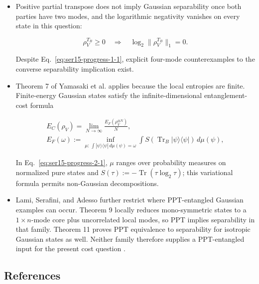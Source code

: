\begin{itemize}
  \item Positive partial transpose does not imply Gaussian separability once both parties have two modes, and the logarithmic negativity vanishes on every state in this question:

\begin{equation}
\rho_V^{T_B}\geq0\quad\Longrightarrow\quad
\log_2\|\rho_V^{T_B}\|_1=0.
\label{eq:ser15-progress-1-1}
\end{equation}

Despite Eq.~\eqref{eq:ser15-progress-1-1}, explicit four-mode counterexamples to the converse separability implication exist. 

  \item Theorem 7 of Yamasaki et al. applies because the local entropies are finite. Finite-energy Gaussian states satisfy the infinite-dimensional entanglement-cost formula

\begin{equation}
\begin{gathered}
E_C(\rho_V)=\lim_{N\to\infty}\frac{E_F(\rho_V^{\otimes N})}{N},\\
E_F(\omega):=\inf_{\mu:\,\int|\psi\rangle\langle\psi|\,d\mu(\psi)=\omega}
\int S(\operatorname{Tr}_B|\psi\rangle\langle\psi|)\,d\mu(\psi),
\end{gathered}
\label{eq:ser15-progress-2-1}
\end{equation}

In Eq.~\eqref{eq:ser15-progress-2-1}, $\mu$ ranges over probability measures on normalized pure states and $S(\tau):=-\operatorname{Tr}(\tau\log_2\tau)$; this variational formula permits non-Gaussian decompositions. 

  \item Lami, Serafini, and Adesso further restrict where PPT-entangled Gaussian examples can occur. Theorem 9 locally reduces mono-symmetric states to a $1\times n$-mode core plus uncorrelated local modes, so PPT implies separability in that family. Theorem 11 proves PPT equivalence to separability for isotropic Gaussian states as well. Neither family therefore supplies a PPT-entangled input for the present cost question .
\end{itemize}

\subsection*{References}

